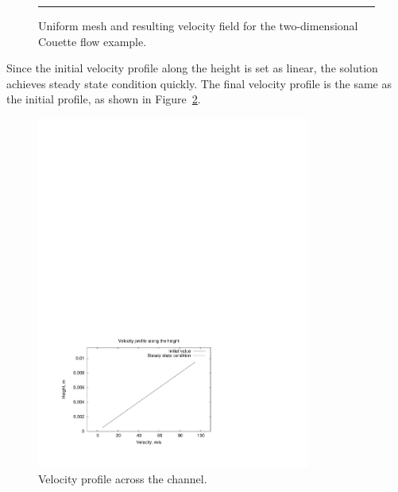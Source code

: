 \begin{figure}[htbp]
 \centering
 \rule{2mm}{0mm}
 \caption{Uniform mesh and resulting velocity field for the two-dimensional Couette flow example.}
 \label{couette-mesh-and-velocity-fig}
\end{figure}

Since the initial velocity profile along the height is set as linear, 
the solution achieves steady state condition quickly.
The final velocity profile is the same as the initial profile, 
as shown in Figure~\ref{couette-velocity-profile-fig}.

\begin{figure}[htbp]
\begin{center}
\includegraphics[width=0.8\textwidth,viewport=38 49 422 302,clip=true]{../2D/couette-flow/velocity.pdf}
\end{center}
\caption{Velocity profile across the channel.}
   \label{couette-velocity-profile-fig}
\end{figure}

